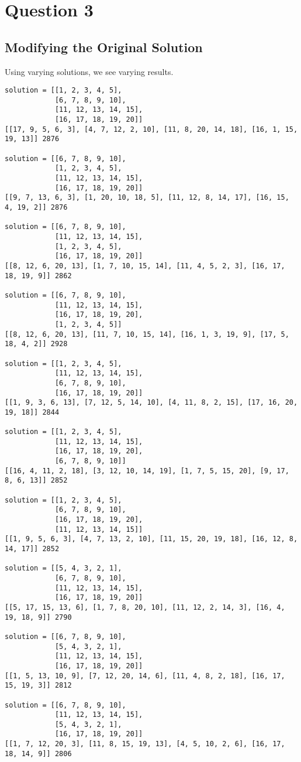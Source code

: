 \documentclass[12pt]{article}
\begin{document}
\section*{Question 3}
\subsection*{Modifying the Original Solution}
Using varying solutions, we see varying results.
\begin{lstlisting}[breaklines=true]
solution = [[1, 2, 3, 4, 5],
            [6, 7, 8, 9, 10],
            [11, 12, 13, 14, 15],
            [16, 17, 18, 19, 20]]
[[17, 9, 5, 6, 3], [4, 7, 12, 2, 10], [11, 8, 20, 14, 18], [16, 1, 15, 19, 13]] 2876

solution = [[6, 7, 8, 9, 10],
            [1, 2, 3, 4, 5],
            [11, 12, 13, 14, 15],
            [16, 17, 18, 19, 20]]
[[9, 7, 13, 6, 3], [1, 20, 10, 18, 5], [11, 12, 8, 14, 17], [16, 15, 4, 19, 2]] 2876

solution = [[6, 7, 8, 9, 10],
            [11, 12, 13, 14, 15],
            [1, 2, 3, 4, 5],
            [16, 17, 18, 19, 20]]
[[8, 12, 6, 20, 13], [1, 7, 10, 15, 14], [11, 4, 5, 2, 3], [16, 17, 18, 19, 9]] 2862

solution = [[6, 7, 8, 9, 10],
            [11, 12, 13, 14, 15],
            [16, 17, 18, 19, 20],
            [1, 2, 3, 4, 5]]
[[8, 12, 6, 20, 13], [11, 7, 10, 15, 14], [16, 1, 3, 19, 9], [17, 5, 18, 4, 2]] 2928

solution = [[1, 2, 3, 4, 5],
            [11, 12, 13, 14, 15],
            [6, 7, 8, 9, 10],
            [16, 17, 18, 19, 20]]
[[1, 9, 3, 6, 13], [7, 12, 5, 14, 10], [4, 11, 8, 2, 15], [17, 16, 20, 19, 18]] 2844

solution = [[1, 2, 3, 4, 5],
            [11, 12, 13, 14, 15],
            [16, 17, 18, 19, 20],
            [6, 7, 8, 9, 10]]
[[16, 4, 11, 2, 18], [3, 12, 10, 14, 19], [1, 7, 5, 15, 20], [9, 17, 8, 6, 13]] 2852

solution = [[1, 2, 3, 4, 5],
            [6, 7, 8, 9, 10],
            [16, 17, 18, 19, 20],
            [11, 12, 13, 14, 15]]
[[1, 9, 5, 6, 3], [4, 7, 13, 2, 10], [11, 15, 20, 19, 18], [16, 12, 8, 14, 17]] 2852

solution = [[5, 4, 3, 2, 1],
            [6, 7, 8, 9, 10],
            [11, 12, 13, 14, 15],
            [16, 17, 18, 19, 20]]
[[5, 17, 15, 13, 6], [1, 7, 8, 20, 10], [11, 12, 2, 14, 3], [16, 4, 19, 18, 9]] 2790

solution = [[6, 7, 8, 9, 10],
            [5, 4, 3, 2, 1],
            [11, 12, 13, 14, 15],
            [16, 17, 18, 19, 20]]
[[1, 5, 13, 10, 9], [7, 12, 20, 14, 6], [11, 4, 8, 2, 18], [16, 17, 15, 19, 3]] 2812

solution = [[6, 7, 8, 9, 10],
            [11, 12, 13, 14, 15],
            [5, 4, 3, 2, 1],
            [16, 17, 18, 19, 20]]
[[1, 7, 12, 20, 3], [11, 8, 15, 19, 13], [4, 5, 10, 2, 6], [16, 17, 18, 14, 9]] 2806
\end{lstlisting}
\end{document}
